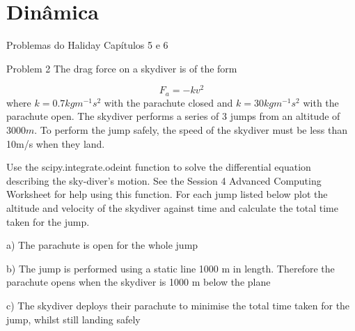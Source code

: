 \chapter{Dinâmica}
Problemas do Haliday Capítulos 5 e 6

Problem 2
The drag force on a skydiver is of the form

\[F_a=-kv^2\]
where $k = 0.7kgm^{-1}{s^2}$ with the parachute closed and $k = 30kgm^{-1}s^2$ with the parachute open. The skydiver performs a series of 3 jumps from an altitude of $3000m$. To perform the jump safely, the speed of the skydiver must be less than 10m/s when they land.

Use the scipy.integrate.odeint function to solve the diﬀerential equation describing the sky-diver’s motion. See the Session 4 Advanced Computing Worksheet for help using this function. For each jump listed below plot the altitude and velocity of the skydiver against time and calculate the total time taken for the jump.

a) The parachute is open for the whole jump

b) The jump is performed using a static line 1000 m in length. Therefore the parachute opens when the skydiver is 1000 m below the plane

c) The skydiver deploys their parachute to minimise the total time taken for the jump, whilst still landing safely